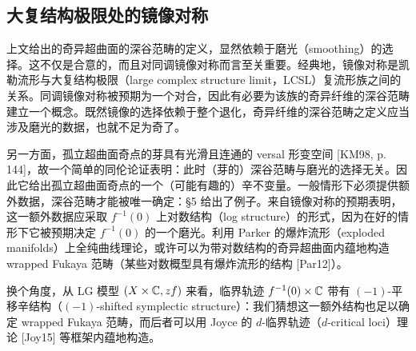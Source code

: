 \subsection{大复结构极限处的镜像对称}

上文给出的奇异超曲面的深谷范畴的定义，显然依赖于磨光（smoothing）的选择。这不仅是合意的，而且对同调镜像对称而言至关重要。经典地，镜像对称是凯勒流形与大复结构极限（large complex structure limit，LCSL）复流形族之间的关系。同调镜像对称被预期为一个对合，因此有必要为该族的奇异纤维的深谷范畴建立一个概念。既然镜像的选择依赖于整个退化，奇异纤维的深谷范畴之定义应当涉及磨光的数据，也就不足为奇了。


另一方面，孤立超曲面奇点的芽具有光滑且连通的 versal 形变空间 [KM98, p. 144]，故一个简单的同伦论证表明：此时（芽的）深谷范畴与磨光的选择无关。因此它给出孤立超曲面奇点的一个（可能有趣的）辛不变量。一般情形下必须提供额外数据，深谷范畴才能被唯一确定：§5 给出了例子。来自镜像对称的预期表明，这一额外数据应采取 $f^{-1}(0)$ 上对数结构（log structure）的形式，因为在好的情形下它被预期决定 $f^{-1}(0)$ 的一个磨光。利用 Parker 的爆炸流形（exploded manifolds）上全纯曲线理论，或许可以为带对数结构的奇异超曲面内蕴地构造 wrapped Fukaya 范畴（某些对数概型具有爆炸流形的结构 [Par12]）。


换个角度，从 LG 模型 $(X\times\mathbb{C},zf)$ 来看，临界轨迹 $f^{-1}(0)\times\mathbb{C}$ 带有 $(-1)$-平移辛结构（$(-1)$-shifted symplectic structure）：我们猜想这一额外结构也足以确定 wrapped Fukaya 范畴，而后者可以用 Joyce 的 $d$-临界轨迹（$d$-critical loci）理论 [Joy15] 等框架内蕴地构造。


